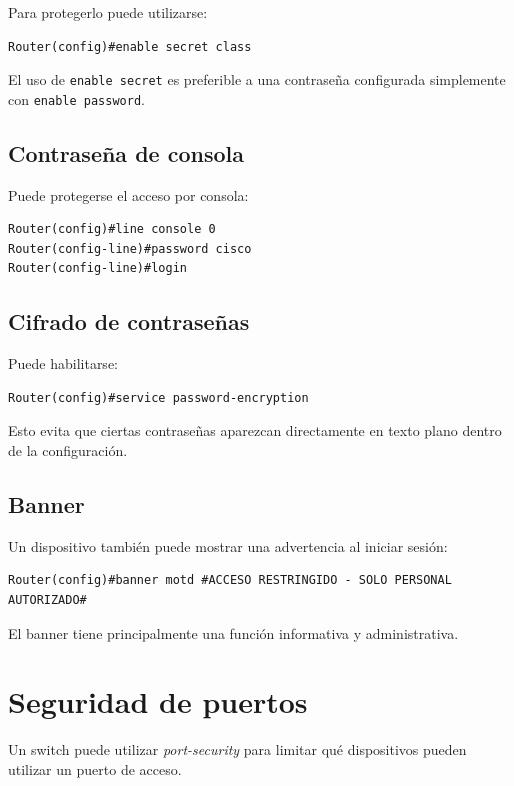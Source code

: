 \documentclass[12pt]{article}
\begin{document}
Para protegerlo puede utilizarse:

\begin{lstlisting}
Router(config)#enable secret class
\end{lstlisting}

El uso de \texttt{enable secret} es preferible a una contraseña configurada
simplemente con \texttt{enable password}.


\subsection{Contraseña de consola}

Puede protegerse el acceso por consola:

\begin{lstlisting}
Router(config)#line console 0
Router(config-line)#password cisco
Router(config-line)#login
\end{lstlisting}


\subsection{Cifrado de contraseñas}

Puede habilitarse:

\begin{lstlisting}
Router(config)#service password-encryption
\end{lstlisting}

Esto evita que ciertas contraseñas aparezcan directamente en texto plano
dentro de la configuración.


\subsection{Banner}

Un dispositivo también puede mostrar una advertencia al iniciar sesión:

\begin{lstlisting}
Router(config)#banner motd #ACCESO RESTRINGIDO - SOLO PERSONAL AUTORIZADO#
\end{lstlisting}

El banner tiene principalmente una función informativa y administrativa.


\section{Seguridad de puertos}

Un switch puede utilizar \textit{port-security} para limitar qué dispositivos
pueden utilizar un puerto de acceso.
\end{document}
